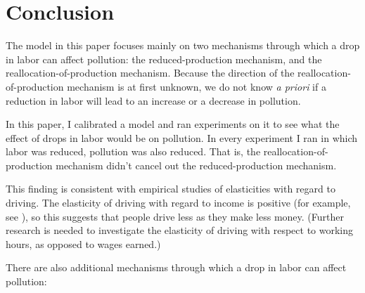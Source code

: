\documentclass[letter, 12pt, epsf,leqno]{article}
\begin{document}
\section{Conclusion}\label{sec:conclusion}


The model in this paper focuses mainly on two mechanisms through which a drop in labor can affect pollution: the reduced-production mechanism, and the reallocation-of-production mechanism.  Because the direction of the reallocation-of-production mechanism is at first unknown, we do not know \textit{a priori} if a reduction in labor will lead to an increase or a decrease in pollution.  

In this paper, I calibrated a model and ran experiments on it to see what the effect of drops in labor would be on pollution.  In every experiment I ran in which labor was reduced, pollution was also reduced.  That is, the reallocation-of-production mechanism didn't cancel out the reduced-production mechanism.

This finding is consistent with empirical studies of elasticities with regard to driving.  The elasticity of driving with regard to income is positive (for example, see \citet{berry}), so this suggests that people drive less as they make less money.  (Further research is needed to investigate the elasticity of driving with respect to working hours, as opposed to wages earned.)  

There are also additional mechanisms through which a drop in labor can affect pollution:
\end{document}
